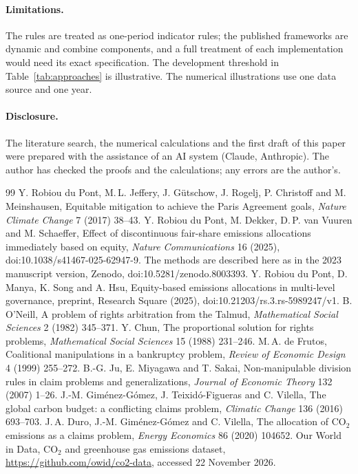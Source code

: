 \documentclass[11pt]{article}
\theoremstyle{definition}
\theoremstyle{remark}
\begin{document}
\paragraph{Limitations.} The rules are treated as one-period indicator rules; the published frameworks are dynamic and combine components, and a full treatment of each implementation would need its exact specification. The development threshold in Table~\ref{tab:approaches} is illustrative. The numerical illustrations use one data source and one year.

\paragraph{Disclosure.} The literature search, the numerical calculations and the first draft of this paper were prepared with the assistance of an AI system (Claude, Anthropic). The author has checked the proofs and the calculations; any errors are the author's.

\begin{thebibliography}{99}
 Y. Robiou du Pont, M.\,L. Jeffery, J. G\"utschow, J. Rogelj, P. Christoff and M. Meinshausen, Equitable mitigation to achieve the Paris Agreement goals, \emph{Nature Climate Change} 7 (2017) 38--43.
 Y. Robiou du Pont, M. Dekker, D.\,P. van Vuuren and M. Schaeffer, Effect of discontinuous fair-share emissions allocations immediately based on equity, \emph{Nature Communications} 16 (2025), doi:10.1038/s41467-025-62947-9. The methods are described here as in the 2023 manuscript version, Zenodo, doi:10.5281/zenodo.8003393.
 Y. Robiou du Pont, D. Manya, K. Song and A. Hsu, Equity-based emissions allocations in multi-level governance, preprint, Research Square (2025), doi:10.21203/rs.3.rs-5989247/v1.
 B. O'Neill, A problem of rights arbitration from the Talmud, \emph{Mathematical Social Sciences} 2 (1982) 345--371.
 Y. Chun, The proportional solution for rights problems, \emph{Mathematical Social Sciences} 15 (1988) 231--246.
 M.\,A. de Frutos, Coalitional manipulations in a bankruptcy problem, \emph{Review of Economic Design} 4 (1999) 255--272.
 B.-G. Ju, E. Miyagawa and T. Sakai, Non-manipulable division rules in claim problems and generalizations, \emph{Journal of Economic Theory} 132 (2007) 1--26.
 J.-M. Gim\'enez-G\'omez, J. Teixid\'o-Figueras and C. Vilella, The global carbon budget: a conflicting claims problem, \emph{Climatic Change} 136 (2016) 693--703.
 J.\,A. Duro, J.-M. Gim\'enez-G\'omez and C. Vilella, The allocation of CO$_2$ emissions as a claims problem, \emph{Energy Economics} 86 (2020) 104652.
 Our World in Data, CO$_2$ and greenhouse gas emissions dataset, \url{https://github.com/owid/co2-data}, accessed 22 November 2026.
\end{thebibliography}
\end{document}
